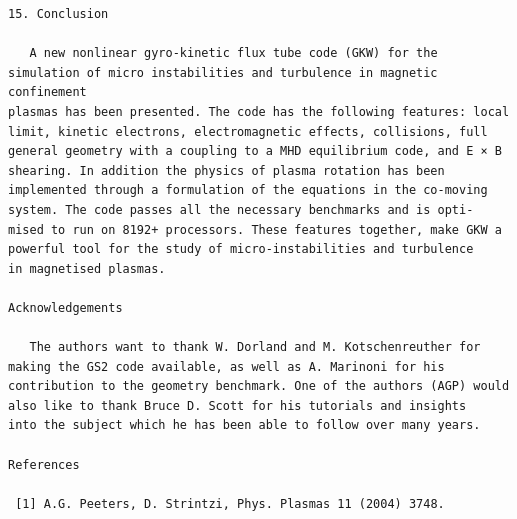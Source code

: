 \documentclass[a4paper]{article}
\newcommand{\gkwpagefont}{\fontsize{6.0pt}{7.55pt}\selectfont}
\begin{document}
\begin{Verbatim}[fontsize=\gkwpagefont]
15. Conclusion

   A new nonlinear gyro-kinetic flux tube code (GKW) for the simulation of micro instabilities and turbulence in magnetic confinement
plasmas has been presented. The code has the following features: local limit, kinetic electrons, electromagnetic effects, collisions, full
general geometry with a coupling to a MHD equilibrium code, and E × B shearing. In addition the physics of plasma rotation has been
implemented through a formulation of the equations in the co-moving system. The code passes all the necessary benchmarks and is opti-
mised to run on 8192+ processors. These features together, make GKW a powerful tool for the study of micro-instabilities and turbulence
in magnetised plasmas.

Acknowledgements

   The authors want to thank W. Dorland and M. Kotschenreuther for making the GS2 code available, as well as A. Marinoni for his
contribution to the geometry benchmark. One of the authors (AGP) would also like to thank Bruce D. Scott for his tutorials and insights
into the subject which he has been able to follow over many years.

References

 [1] A.G. Peeters, D. Strintzi, Phys. Plasmas 11 (2004) 3748.
\end{Verbatim}
\newpage
\end{document}
